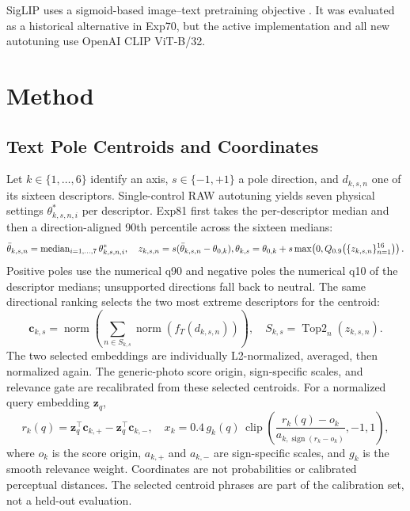 \documentclass[journal]{IEEEtran}
\begin{document}
SigLIP uses a sigmoid-based image--text pretraining objective \cite{zhai2023siglip}. It was evaluated as a historical alternative in Exp70, but the active implementation and all new autotuning use OpenAI CLIP ViT-B/32.

\section{Method}
\subsection{Text Pole Centroids and Coordinates}
Let $k\in\{1,\ldots,6\}$ identify an axis, $s\in\{-1,+1\}$ a pole direction, and $d_{k,s,n}$ one of its sixteen descriptors. Single-control RAW autotuning yields seven physical settings $\theta^*_{k,s,n,i}$ per descriptor. Exp81 first takes the per-descriptor median and then a direction-aligned 90th percentile across the sixteen medians:
\begin{equation}
 \bar\theta_{k,s,n}=\operatorname{median}_{i=1,\ldots,7}\theta^*_{k,s,n,i},\quad
 z_{k,s,n}=s(\bar\theta_{k,s,n}-\theta_{0,k}),\\
 \theta_{k,s}=\theta_{0,k}+s\max\!\left(0,Q_{0.9}\!\left(\{z_{k,s,n}\}_{n=1}^{16}\right)\right).
\end{equation}
Positive poles use the numerical q90 and negative poles the numerical q10 of the descriptor medians; unsupported directions fall back to neutral. The same directional ranking selects the two most extreme descriptors for the centroid:
\begin{equation}
 \mathbf{c}_{k,s}=\operatorname{norm}\!\left(\sum_{n\in S_{k,s}}
 \operatorname{norm}(f_T(d_{k,s,n}))\right),\quad
 S_{k,s}=\operatorname{Top2}_{n}(z_{k,s,n}).
\end{equation}
The two selected embeddings are individually L2-normalized, averaged, then normalized again. The generic-photo score origin, sign-specific scales, and relevance gate are recalibrated from these selected centroids. For a normalized query embedding $\mathbf{z}_q$,
\begin{equation}
 r_k(q)=\mathbf{z}_q^\top\mathbf{c}_{k,+}-\mathbf{z}_q^\top\mathbf{c}_{k,-},\quad
 x_k=0.4\,g_k(q)\,\operatorname{clip}\!\left(\frac{r_k(q)-o_k}{a_{k,\operatorname{sign}(r_k-o_k)}},-1,1\right),
\end{equation}
where $o_k$ is the score origin, $a_{k,+}$ and $a_{k,-}$ are sign-specific scales, and $g_k$ is the smooth relevance weight. Coordinates are not probabilities or calibrated perceptual distances. The selected centroid phrases are part of the calibration set, not a held-out evaluation.
\end{document}
